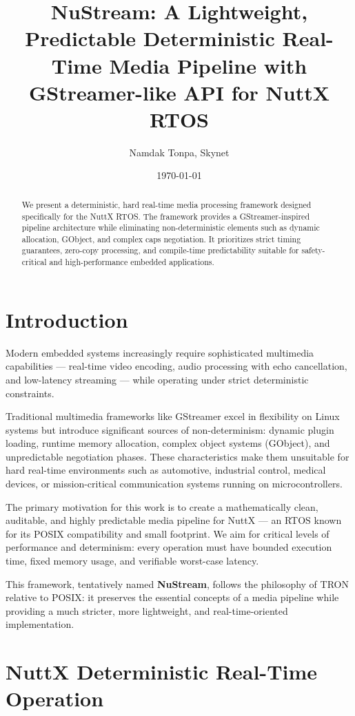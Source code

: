 \documentclass{article}
\title{\textbf{NuStream}: A Lightweight, Predictable Deterministic Real-Time Media Pipeline with GStreamer-like API for \textbf{NuttX} RTOS}
\author{Namdak Tonpa, Skynet}
\date{\today}
\begin{document}
\maketitle

\begin{abstract}
We present a deterministic, hard real-time media processing framework designed specifically for the NuttX RTOS.
The framework provides a GStreamer-inspired pipeline architecture while eliminating non-deterministic elements such as dynamic allocation, GObject, and complex caps negotiation. 
It prioritizes strict timing guarantees, zero-copy processing, and compile-time predictability suitable for safety-critical and high-performance embedded applications.
\end{abstract}

\section{Introduction}

Modern embedded systems increasingly require sophisticated multimedia capabilities — real-time video encoding, audio processing with echo cancellation, and low-latency streaming — while operating under strict deterministic constraints. 

Traditional multimedia frameworks like GStreamer excel in flexibility on Linux systems but introduce significant sources of non-determinism: dynamic plugin loading, runtime memory allocation, complex object systems (GObject), and unpredictable negotiation phases. These characteristics make them unsuitable for hard real-time environments such as automotive, industrial control, medical devices, or mission-critical communication systems running on microcontrollers.

The primary motivation for this work is to create a mathematically clean, auditable, and highly predictable media pipeline for NuttX — an RTOS known for its POSIX compatibility and small footprint. 
We aim for critical levels of performance and determinism: every operation must have bounded execution time, fixed memory usage, and verifiable worst-case latency.

This framework, tentatively named \textbf{NuStream}, follows the philosophy of TRON relative to POSIX: it preserves the essential concepts of a media pipeline while providing a much stricter, more lightweight, and real-time-oriented implementation.

\section{NuttX Deterministic Real-Time Operation}
\end{document}
